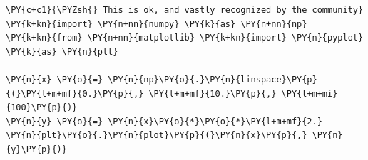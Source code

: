 \begin{Verbatim}[label=\makebox{\url{https://github.com/lucabaldini/cmepda/tree/master/slides/latex/snippets/import1.py}},commandchars=\\\{\}]
\PY{c+c1}{\PYZsh{} This is ok, and vastly recognized by the community}
\PY{k+kn}{import} \PY{n+nn}{numpy} \PY{k}{as} \PY{n+nn}{np}
\PY{k+kn}{from} \PY{n+nn}{matplotlib} \PY{k+kn}{import} \PY{n}{pyplot} \PY{k}{as} \PY{n}{plt}

\PY{n}{x} \PY{o}{=} \PY{n}{np}\PY{o}{.}\PY{n}{linspace}\PY{p}{(}\PY{l+m+mf}{0.}\PY{p}{,} \PY{l+m+mf}{10.}\PY{p}{,} \PY{l+m+mi}{100}\PY{p}{)}
\PY{n}{y} \PY{o}{=} \PY{n}{x}\PY{o}{*}\PY{o}{*}\PY{l+m+mf}{2.}
\PY{n}{plt}\PY{o}{.}\PY{n}{plot}\PY{p}{(}\PY{n}{x}\PY{p}{,} \PY{n}{y}\PY{p}{)}
\end{Verbatim}
